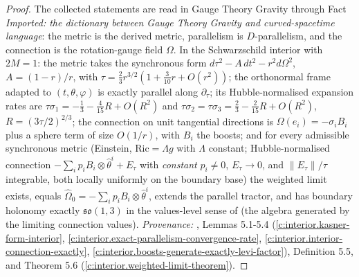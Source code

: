 \documentclass[11pt]{article}
\theoremstyle{definition}
\theoremstyle{plain}
\begin{document}
\begin{proof}
The collected statements are read in Gauge Theory Gravity through Fact \emph{Imported: the dictionary between Gauge Theory Gravity and curved-spacetime language}: the metric is the derived metric, parallelism is $D$-parallelism, and the connection is the rotation-gauge field $\Omega$. In the Schwarzschild interior with $2M = 1$: the metric takes the synchronous form $d\tau^2 - A\,dt^2 - r^2 d\Omega^2$, $A = (1-r)/r$, with $\tau = \tfrac23 r^{3/2}(1 + \tfrac{3}{10}r + O(r^2))$; the orthonormal frame adapted to $(t, \theta, \varphi)$ is exactly parallel along $\partial_\tau$; its Hubble-normalised expansion rates are $\tau\sigma_1 = -\tfrac13 - \tfrac{4}{15}R + O(R^2)$ and $\tau\sigma_2 = \tau\sigma_3 = \tfrac23 - \tfrac{2}{15}R + O(R^2)$, $R = (3\tau/2)^{2/3}$; the connection on unit tangential directions is $\Omega(e_i) = -\sigma_i B_i$ plus a sphere term of size $O(1/r)$, with $B_i$ the boosts; and for every admissible synchronous metric (Einstein, $\mathrm{Ric} = \Lambda g$ with $\Lambda$ constant; Hubble-normalised connection $-\sum_i p_iB_i \otimes \hat\theta^i + E_\tau$ with \emph{constant} $p_i \neq 0$, $E_\tau \to 0$, and $\|E_\tau\|/\tau$ integrable, both locally uniformly on the boundary base) the weighted limit exists, equals $\widehat\Omega_0 = -\sum_i p_i B_i \otimes \hat\theta^i$, extends the parallel tractor, and has boundary holonomy exactly $\mathfrak{so}(1,3)$ in the values-level sense of \cite[Def.~5.5]{ButlerT6} (the algebra generated by the limiting connection values). \emph{Provenance:} \cite{ButlerT6}, Lemmas 5.1-5.4 (\ref{c:interior.kasner-form-interior}, \ref{c:interior.exact-parallelism-convergence-rate}, \ref{c:interior.interior-connection-exactly}, \ref{c:interior.boosts-generate-exactly-levi-factor}), Definition 5.5, and Theorem 5.6 (\ref{c:interior.weighted-limit-theorem}).

\end{proof}
\end{document}

